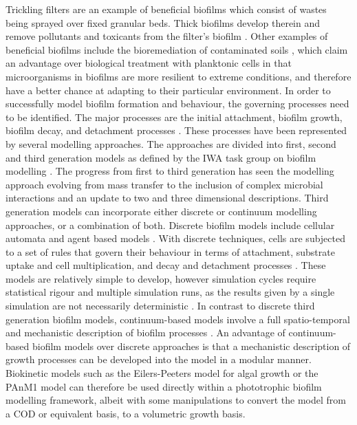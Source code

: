 Trickling filters are an example of beneficial biofilms which consist of wastes being sprayed over fixed granular beds. Thick biofilms develop therein and remove pollutants and toxicants from the filter's biofilm \cite{donlan2002}. Other examples of beneficial biofilms include the bioremediation of contaminated soils \cite{singh2006}, which claim an advantage over biological treatment with planktonic cells in that microorganisms in biofilms are more resilient to extreme conditions, and therefore have a better chance at adapting to their particular environment. 
\skippingparagraph
In order to successfully model biofilm formation and behaviour, the governing processes need to be identified. The major processes are the initial attachment, biofilm growth, biofilm decay, and detachment processes \cite{alpkvist2007}. 
These processes have been represented by several modelling approaches. The approaches are divided into first, second and third generation models as defined by the IWA task group on biofilm modelling \cite{wanner2006}. The progress from first to third generation has seen the modelling approach evolving from mass transfer to the inclusion of complex microbial interactions and an update to two and three dimensional descriptions. Third generation models can incorporate either discrete or continuum modelling approaches, or a combination of both. Discrete biofilm models include cellular automata and agent based models \cite{skoneczny2015}. With discrete techniques, cells are subjected to a set of rules that govern their behaviour in terms of attachment, substrate uptake and cell multiplication, and decay and detachment processes \cite{skoneczny2015}. These models are relatively simple to develop, however simulation cycles require statistical rigour and multiple simulation runs, as the results given by a single simulation are not necessarily deterministic \cite{dacunto2017}. In contrast to discrete third generation biofilm models, continuum-based models involve a full spatio-temporal and mechanistic description of biofilm processes \cite{eberl2001}. An advantage of continuum-based biofilm models over discrete approaches is that a mechanistic description of growth processes can be developed into the model in a modular manner. Biokinetic models such as the Eilers-Peeters model for algal growth \cite{eilers1988} or the PAnM1 model \cite{puyol2017} can therefore be used directly within a phototrophic biofilm modelling framework, albeit with some manipulations to convert the model from a COD or equivalent basis, to a volumetric growth basis. 
\skippingparagraph

